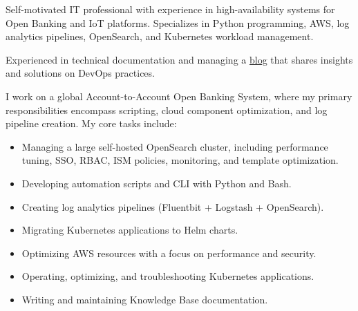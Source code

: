 \documentclass[10pt,a4paper]{altacv}
\begin{document}



\begin{fullwidth}
    \makecvheader
\end{fullwidth}



Self-motivated IT professional with experience in high-availability systems for Open Banking and IoT platforms. Specializes in Python programming, AWS, log analytics pipelines, OpenSearch, and Kubernetes workload management.

\bigskip

Experienced in technical documentation and managing a \href{https://www.carlosneto.dev/}{\uline{blog}} that shares insights and solutions on DevOps practices.



I work on a global Account-to-Account Open Banking System, where my primary responsibilities encompass scripting, cloud component optimization, and log pipeline creation. My core tasks include:

\bigskip

\begin{itemize}
    \item Managing a large self-hosted OpenSearch cluster, including performance tuning, SSO, RBAC, ISM policies, monitoring, and template optimization.
    \item Developing automation scripts and CLI with Python and Bash.
    \item Creating log analytics pipelines (Fluentbit + Logstash + OpenSearch).
    \item Migrating Kubernetes applications to Helm charts.
    \item Optimizing AWS resources with a focus on performance and security.
    \item Operating, optimizing, and troubleshooting Kubernetes applications.
    \item Writing and maintaining Knowledge Base documentation.
\end{itemize}
\end{document}
